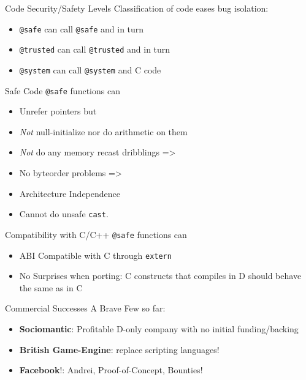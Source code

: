 \documentclass[xcolor=dvipsnames]{beamer}
\begin{document}
\begin{frame}[fragile]{Code Security/Safety Levels}
  Classification of code eases bug isolation:
  \begin{itemize}[<+->]
  \item \texttt{@safe} can call \texttt{@safe} and in turn
  \item \texttt{@trusted} can call \texttt{@trusted} and in turn
  \item \texttt{@system} can call \texttt{@system} and C code
  \end{itemize}
\end{frame}

\begin{frame}[fragile]{Safe Code}
  \texttt{@safe} functions can
  \begin{itemize}[<+->]
  \item Unrefer pointers but
  \item \emph{Not} null-initialize nor do arithmetic on them
  \item \emph{Not} do any memory recast dribblings =>
  \item No byteorder problems =>
  \item Architecture Independence
  \item Cannot do unsafe \texttt{cast}.
  \end{itemize}
\end{frame}

\begin{frame}[fragile]{Compatibility with C/C++}
  \texttt{@safe} functions can
  \begin{itemize}[<+->]
  \item ABI Compatible with C through \texttt{extern}
  \item No Surprises when porting: C constructs that compiles in D should
    behave the same as in C
  \end{itemize}
\end{frame}

\begin{frame}[fragile]{Commercial Successes}
  A Brave Few so far:
  \begin{itemize}[<+->]
  \item \textbf{Sociomantic}: Profitable D-only company with no initial
    funding/backing
  \item \textbf{British Game-Engine}: replace scripting languages!
  \item \textbf{Facebook}!: Andrei, Proof-of-Concept, Bounties!
  \end{itemize}
\end{frame}
\end{document}
